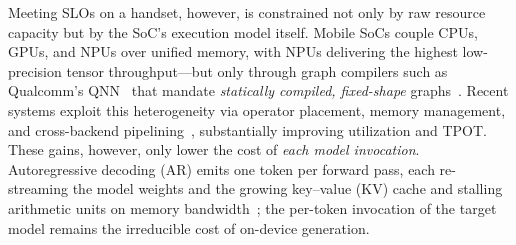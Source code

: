 \documentclass[sigconf,nonacm,10pt]{acmart}
\begin{document}
Meeting SLOs on a handset, however, is constrained not only by raw resource capacity but by the SoC's execution model itself. Mobile SoCs couple CPUs, GPUs, and NPUs over unified memory, with NPUs delivering the highest low-precision tensor throughput---but only through graph compilers such as Qualcomm's QNN~\cite{qnnsdk} that mandate \emph{statically compiled, fixed-shape} graphs~\cite{chen2025heteroinfer,xu2025fastondevice,yin2025shadowattn}. Recent systems exploit this heterogeneity via operator placement, memory management, and cross-backend pipelining~\cite{xu2025fastondevice,chen2025heteroinfer}, substantially improving utilization and TPOT. These gains, however, only lower the cost of \emph{each model invocation}. Autoregressive decoding (AR) emits one token per forward pass, each re-streaming the model weights and the growing key--value (KV) cache and stalling arithmetic units on memory bandwidth~\cite{Efficient2023Woosuk}; the per-token invocation of the target model remains the irreducible cost of on-device generation.
\end{document}
